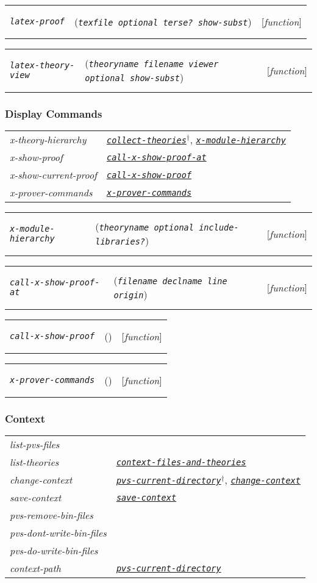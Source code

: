 \documentclass[12pt]{book}
\makeatletter
\def\ampoptional{{\smaller\sc {\smaller\smaller \&}optional\ }}
\newenvironment{function}[3]%
{\par\noindent\begin{boxedminipage}{\textwidth}%
 \par\noindent\begin{tabularx}{\linewidth}{l>{\raggedright}Xr}%
 \functionhtgt{#1}&(\texttt{\textit{#2}})&[\emph{#3}]%
 \end{tabularx}\par\flushright\begin{minipage}{.97\textwidth}}
{\end{minipage}\end{boxedminipage}}
\newcommand{\functionnm}[1]{\texttt{\textit{#1}}}
\newcommand{\functionhln}[1]{\hyperlink{#1}{\functionnm{#1}}}
\newcommand{\functionhtgt}[1]{\hypertarget{#1}{\functionnm{#1}}\index{#1@\functionnm{#1}|underline}}
\newenvironment{lispfunction}[2]%
{\begin{function}{#1}{#2}{function}}{\end{function}}
\makeatother
\begin{document}
\begin{lispfunction}{latex-proof}{texfile \ampoptional terse? show-subst}
\end{lispfunction}

\begin{lispfunction}{latex-theory-view}
  {theoryname filename viewer \ampoptional show-subst}
\end{lispfunction}


\subsubsection{Display Commands}
\noindent\begin{tabularx}{\linewidth}{|>{\itshape\ttfamily}l|>{\raggedright\arraybackslash}X|}\hline
  x-theory-hierarchy & \functionhln{collect-theories}$^\dagger$,
                       \functionhln{x-module-hierarchy}\\
  x-show-proof & \functionhln{call-x-show-proof-at} \\
  x-show-current-proof & \functionhln{call-x-show-proof} \\
  x-prover-commands & \functionhln{x-prover-commands} \\ \hline
\end{tabularx}

\begin{lispfunction}{x-module-hierarchy}
  {theoryname \ampoptional include-libraries?}
\end{lispfunction}

\begin{lispfunction}{call-x-show-proof-at}{filename declname line origin}
\end{lispfunction}

\begin{lispfunction}{call-x-show-proof}{}
\end{lispfunction}

\begin{lispfunction}{x-prover-commands}{}
\end{lispfunction}


\subsubsection{Context}
\noindent\begin{tabularx}{\linewidth}{|>{\itshape\ttfamily}l|>{\raggedright\arraybackslash}X|}\hline
  list-pvs-files & \\
  list-theories & \functionhln{context-files-and-theories} \\
  change-context & \functionhln{pvs-current-directory}$^\dagger$,
                   \functionhln{change-context} \\
  save-context & \functionhln{save-context} \\
  pvs-remove-bin-files & \\
  pvs-dont-write-bin-files & \\
  pvs-do-write-bin-files & \\
  context-path & \functionhln{pvs-current-directory} \\ \hline
\end{tabularx}
\end{document}
